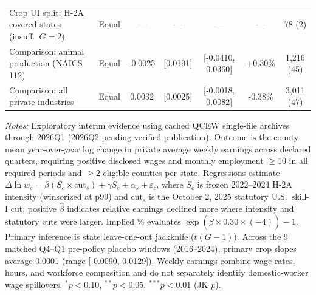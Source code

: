 \begin{table}[!htbp]
\begin{tabular}{lcccccc}
Crop UI split: H-2A covered states (insuff.\ $G=2$) & Equal & --- & --- & --- & --- & 78 (2) \\
Comparison: animal production (NAICS 112) & Equal & -0.0025 & [0.0191] & [-0.0410, 0.0360] & +0.30\% & 1,216 (45) \\
Comparison: all private industries & Equal & 0.0032 & [0.0025] & [-0.0018, 0.0082] & -0.38\% & 3,011 (47) \\
\bottomrule
\end{tabular}
\begin{minipage}{0.96\linewidth}
\vspace{0.4em}\footnotesize
\textit{Notes:} Exploratory interim evidence using cached QCEW single-file archives through 2026Q1 (2026Q2 pending verified publication). Outcome is the county mean year-over-year log change in private average weekly earnings across declared quarters, requiring positive disclosed wages and monthly employment $\ge 10$ in all required periods and $\ge 2$ eligible counties per state. Regressions estimate $\Delta \ln w_c = \beta (S_c \times \text{cut}_s) + \gamma S_c + \alpha_s + \varepsilon_c$, where $S_c$ is frozen 2022--2024 H-2A intensity (winsorized at p99) and $\text{cut}_s$ is the October 2, 2025 statutory U.S.\ skill-I cut; positive $\hat{\beta}$ indicates relative earnings declined more where intensity and statutory cuts were larger. Implied \% evaluates $\exp(\hat{\beta} \times 0.30 \times (-4)) - 1$. Primary inference is state leave-one-out jackknife ($t(G-1)$). Across the 9 matched Q4--Q1 pre-policy placebo windows (2016--2024), primary crop slopes average 0.0001 (range [-0.0090, 0.0129]). Weekly earnings combine wage rates, hours, and workforce composition and do not separately identify domestic-worker wage spillovers. $^{*}p<0.10$, $^{**}p<0.05$, $^{***}p<0.01$ (JK $p$).
\end{minipage}
\end{table}
